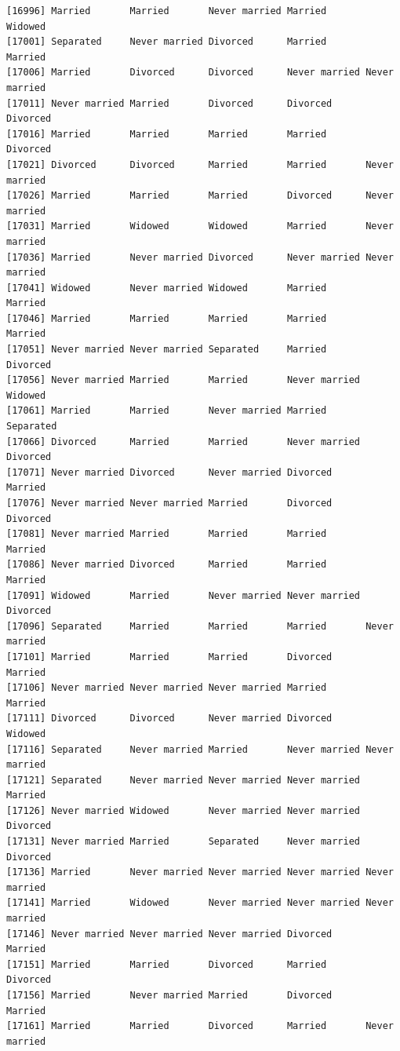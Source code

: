 \documentclass[
  letterpaper,
  DIV=11,
  numbers=noendperiod,
  oneside]{scrartcl}
\begin{document}
\begin{verbatim}
[16996] Married       Married       Never married Married       Widowed      
[17001] Separated     Never married Divorced      Married       Married      
[17006] Married       Divorced      Divorced      Never married Never married
[17011] Never married Married       Divorced      Divorced      Divorced     
[17016] Married       Married       Married       Married       Divorced     
[17021] Divorced      Divorced      Married       Married       Never married
[17026] Married       Married       Married       Divorced      Never married
[17031] Married       Widowed       Widowed       Married       Never married
[17036] Married       Never married Divorced      Never married Never married
[17041] Widowed       Never married Widowed       Married       Married      
[17046] Married       Married       Married       Married       Married      
[17051] Never married Never married Separated     Married       Divorced     
[17056] Never married Married       Married       Never married Widowed      
[17061] Married       Married       Never married Married       Separated    
[17066] Divorced      Married       Married       Never married Divorced     
[17071] Never married Divorced      Never married Divorced      Married      
[17076] Never married Never married Married       Divorced      Divorced     
[17081] Never married Married       Married       Married       Married      
[17086] Never married Divorced      Married       Married       Married      
[17091] Widowed       Married       Never married Never married Divorced     
[17096] Separated     Married       Married       Married       Never married
[17101] Married       Married       Married       Divorced      Married      
[17106] Never married Never married Never married Married       Married      
[17111] Divorced      Divorced      Never married Divorced      Widowed      
[17116] Separated     Never married Married       Never married Never married
[17121] Separated     Never married Never married Never married Married      
[17126] Never married Widowed       Never married Never married Divorced     
[17131] Never married Married       Separated     Never married Divorced     
[17136] Married       Never married Never married Never married Never married
[17141] Married       Widowed       Never married Never married Never married
[17146] Never married Never married Never married Divorced      Married      
[17151] Married       Married       Divorced      Married       Divorced     
[17156] Married       Never married Married       Divorced      Married      
[17161] Married       Married       Divorced      Married       Never married

\end{verbatim}
\end{document}
